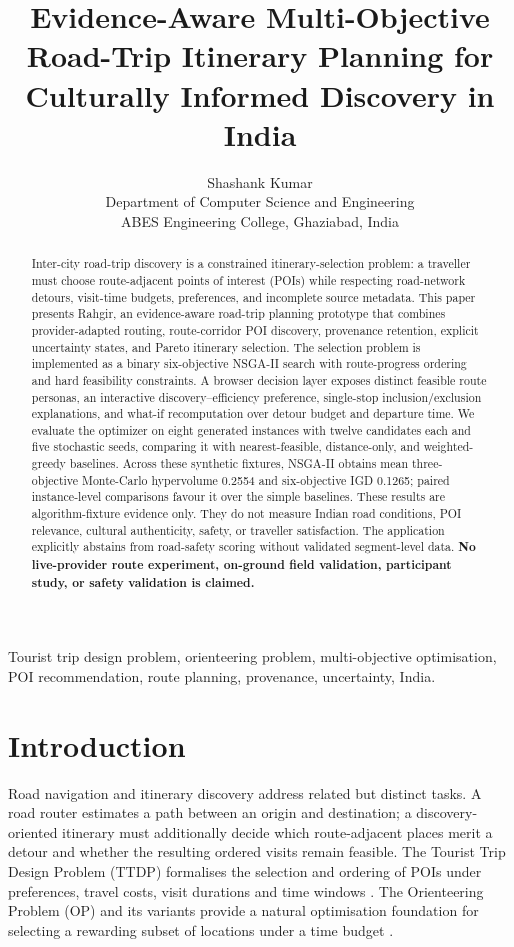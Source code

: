 \documentclass[10pt,conference]{IEEEtran}
\title{Evidence-Aware Multi-Objective Road-Trip Itinerary Planning for Culturally Informed Discovery in India}
\author{Shashank Kumar\\Department of Computer Science and Engineering\\ABES Engineering College, Ghaziabad, India}
\begin{document}
\maketitle
\begin{abstract}
Inter-city road-trip discovery is a constrained itinerary-selection problem: a traveller must choose route-adjacent points of interest (POIs) while respecting road-network detours, visit-time budgets, preferences, and incomplete source metadata. This paper presents Rahgir, an evidence-aware road-trip planning prototype that combines provider-adapted routing, route-corridor POI discovery, provenance retention, explicit uncertainty states, and Pareto itinerary selection. The selection problem is implemented as a binary six-objective NSGA-II search with route-progress ordering and hard feasibility constraints. A browser decision layer exposes distinct feasible route personas, an interactive discovery--efficiency preference, single-stop inclusion/exclusion explanations, and what-if recomputation over detour budget and departure time. We evaluate the optimizer on eight generated instances with twelve candidates each and five stochastic seeds, comparing it with nearest-feasible, distance-only, and weighted-greedy baselines. Across these synthetic fixtures, NSGA-II obtains mean three-objective Monte-Carlo hypervolume 0.2554 and six-objective IGD 0.1265; paired instance-level comparisons favour it over the simple baselines. These results are algorithm-fixture evidence only. They do not measure Indian road conditions, POI relevance, cultural authenticity, safety, or traveller satisfaction. The application explicitly abstains from road-safety scoring without validated segment-level data. \textbf{No live-provider route experiment, on-ground field validation, participant study, or safety validation is claimed.}
\end{abstract}

\begin{IEEEkeywords}
Tourist trip design problem, orienteering problem, multi-objective optimisation, POI recommendation, route planning, provenance, uncertainty, India.
\end{IEEEkeywords}

\section{Introduction}
Road navigation and itinerary discovery address related but distinct tasks. A road router estimates a path between an origin and destination; a discovery-oriented itinerary must additionally decide which route-adjacent places merit a detour and whether the resulting ordered visits remain feasible. The Tourist Trip Design Problem (TTDP) formalises the selection and ordering of POIs under preferences, travel costs, visit durations and time windows \cite{gavalas2014,ruizmeza2022}. The Orienteering Problem (OP) and its variants provide a natural optimisation foundation for selecting a rewarding subset of locations under a time budget \cite{gunawan2016}.
\end{document}
